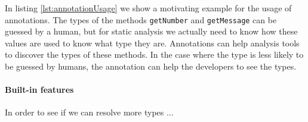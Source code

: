\documentclass[../main.tex]{subfiles}
\begin{document}
    
    
    In listing \ref{lst:annotationUsage} we show a motivating example for the usage of annotations.
    The types of the methods \texttt{getNumber} and \texttt{getMessage} can be guessed by a human, but for static analysis we actually need to know how these values are used to know what type they are.
    Annotations can help analysis tools to discover the types of these methods.
    In the case where the type is less likely to be guessed by humans, the annotation can help the developers to see the types.
    
    \paragraph{Built-in features}
    In order to see if we can resolve more types ...
\end{document}
